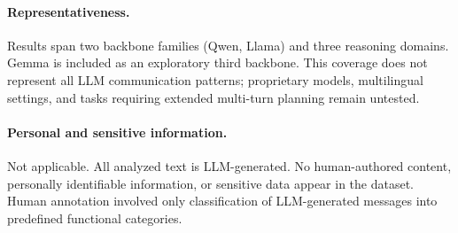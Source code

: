 \paragraph{Representativeness.}
Results span two backbone families (Qwen, Llama) and three reasoning domains. Gemma is included as an exploratory third backbone. This coverage does not represent all LLM communication patterns; proprietary models, multilingual settings, and tasks requiring extended multi-turn planning remain untested.

\paragraph{Personal and sensitive information.}
Not applicable. All analyzed text is LLM-generated. No human-authored content, personally identifiable information, or sensitive data appear in the dataset. Human annotation involved only classification of LLM-generated messages into predefined functional categories.
